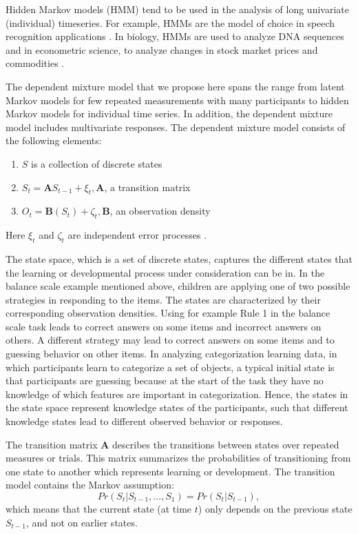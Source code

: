 \documentclass[a4paper,12pt,man,english]{apa} %
\newcommand{\mat}{\mathbf}
\begin{document}
\nocite{McCutcheon1987}

Hidden Markov models (HMM) tend to be used in the analysis of long
univariate (individual) timeseries.  For example, HMMs are the model
of choice in speech recognition applications \cite{Rabiner1989}.  In
biology, HMMs are used to analyze DNA sequences \cite{Krogh1998} and
in econometric science, to analyze changes in stock market prices and
commodities \cite{Kim1994}.

The dependent mixture model that we propose here spans the range from
latent Markov models for few repeated measurements with many
participants to hidden Markov models for individual time series.  In
addition, the dependent mixture model includes multivariate responses.
The dependent mixture model consists of the following elements:
\begin{enumerate}
	\item $S$ is a collection of discrete states
	\item $S_{t} = \mat{A}S_{t-1}+\xi_{t}, \mat{A}$, a transition matrix
	\item $O_{t} = \mat{B}(S_{t}) + \zeta_{t}, \mat{B}$,  an observation density
\end{enumerate}
Here $\xi_{t}$ and $\zeta_{t}$ are independent error processes 
\cite{Elliott1995}. 

The state space, which is a set of discrete states, captures the
different states that the learning or developmental process under
consideration can be in.  In the balance scale example mentioned
above, children are applying one of two possible strategies in
responding to the items.  The states are characterized by their
corresponding observation densities.  Using for example Rule 1 in the
balance scale task leads to correct answers on some items and
incorrect answers on others.  A different strategy may lead to correct
answers on some items and to guessing behavior on other items.  In
analyzing categorization learning data, in which participants learn to
categorize a set of objects, a typical initial state is that
participants are guessing because at the start of the task they have
no knowledge of which features are important in categorization.
Hence, the states in the state space represent knowledge states of the
participants, such that different knowledge states lead to different
observed behavior or responses.

The transition matrix $\mat{A}$ describes the transitions between
states over repeated measures or trials.  This matrix summarizes the
probabilities of transitioning from one state to another which
represents learning or development.  The transition model contains the
Markov assumption:
$$Pr(S_{t}|S_{t-1}, \ldots, S_{1}) = Pr(S_{t}|S_{t-1}),$$
which means that the current state (at time $t$) only depends on the
previous state $S_{t-1}$, and not on earlier states.
\end{document}
